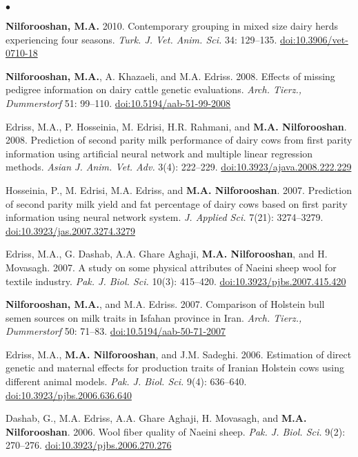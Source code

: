 \documentclass[margin,line]{res}
\newenvironment{list2}{
  \begin{list}{$\bullet$}{%
      \setlength{\itemsep}{0in}
      \setlength{\parsep}{0in} \setlength{\parskip}{0in}
      \setlength{\topsep}{0in} \setlength{\partopsep}{0in}
      \setlength{\leftmargin}{0.2in}}}{\end{list}}
\begin{document}
\begin{resume}
\begin{list2}
\item {\bf Nilforooshan, M.A.} 2010. Contemporary grouping in mixed size dairy herds experiencing four seasons. {\em Turk. J. Vet. Anim. Sci.} 34: 129--135. \href{https://doi.org/10.3906/vet-0710-18}{doi:10.3906/vet-0710-18}
\item {\bf Nilforooshan, M.A.}, A. Khazaeli, and M.A. Edriss. 2008. Effects of missing pedigree information on dairy cattle genetic evaluations. {\em Arch. Tierz., Dummerstorf} 51: 99--110. \href{https://doi.org/10.5194/aab-51-99-2008}{doi:10.5194/aab-51-99-2008}
\item Edriss, M.A., P. Hosseinia, M. Edrisi, H.R. Rahmani, and {\bf M.A. Nilforooshan}. 2008. Prediction of second parity milk performance of dairy cows from first parity information using artificial neural network and multiple linear regression methods. {\em Asian J. Anim. Vet. Adv.} 3(4): 222--229. \href{https://doi.org/10.3923/ajava.2008.222.229}{doi:10.3923/ajava.2008.222.229}
\item Hosseinia, P., M. Edrisi, M.A. Edriss, and {\bf M.A. Nilforooshan}. 2007. Prediction of second parity milk yield and fat percentage of dairy cows based on first parity information using neural network system. {\em J. Applied Sci.} 7(21): 3274--3279. \href{https://doi.org/10.3923/jas.2007.3274.3279}{doi:10.3923/jas.2007.3274.3279}
\item Edriss, M.A., G. Dashab, A.A. Ghare Aghaji, {\bf M.A. Nilforooshan}, and H. Movasagh. 2007. A study on some physical attributes of Naeini sheep wool for textile industry. {\em Pak. J. Biol. Sci.} 10(3): 415--420. \href{https://doi.org/10.3923/pjbs.2007.415.420}{doi:10.3923/pjbs.2007.415.420}
\item {\bf Nilforooshan, M.A.}, and M.A. Edriss. 2007. Comparison of Holstein bull semen sources on milk traits in Isfahan province in Iran. {\em Arch. Tierz., Dummerstorf} 50: 71--83. \href{https://doi.org/10.5194/aab-50-71-2007}{doi:10.5194/aab-50-71-2007}
\item Edriss, M.A., {\bf M.A. Nilforooshan}, and J.M. Sadeghi. 2006. Estimation of direct genetic and maternal effects for production traits of Iranian Holstein cows using different animal models. {\em Pak. J. Biol. Sci.} 9(4): 636--640. \href{https://doi.org/10.3923/pjbs.2006.636.640}{doi:10.3923/pjbs.2006.636.640}
\item Dashab, G., M.A. Edriss, A.A. Ghare Aghaji, H. Movasagh, and {\bf M.A. Nilforooshan}. 2006. Wool fiber quality of Naeini sheep. {\em Pak. J. Biol. Sci.} 9(2): 270--276. \href{https://doi.org/10.3923/pjbs.2006.270.276}{doi:10.3923/pjbs.2006.270.276}

\end{list2}
\end{resume}
\end{document}
